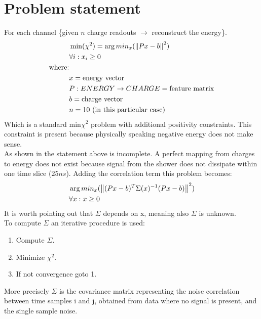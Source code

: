 \section{Problem statement}
For each channel \{given $n$ charge readouts $\rightarrow$ reconstruct the energy\}. \\
\begin{equation}\label{eq:chisq}
  \begin{split}
    & \min(\chi^2)=\arg min_x(\left\lVert Px - b\right\rVert^2) \\
    & \forall i: x_i \geq 0\\
    \text{where:}&  \\
    & x = \text{energy vector} \\
    & P:ENERGY \rightarrow CHARGE =\text{feature matrix} \\
    & b = \text{charge vector}\\
    & n = 10 \text{ (in this particular case)}
  \end{split}
\end{equation}
Which is a standard min$\chi^2$ problem with additional positivity constraints. This constraint is present because physically speaking negative energy does not make sense. \\
As shown in \cite{amplituamplitude_reconde_recon} the statement above is incomplete. A perfect mapping from charges to energy does not exist because signal from the shower does not dissipate within one time slice ($25ns$). Adding the correlation term this problem becomes:
\begin{equation}\label{eq:constrained_chi_sq}
  \begin{split}
      &\arg min_x(\left\lVert(Px - b)^T\Sigma(x)^{-1}(Px - b)\right\rVert^2) \\
      & \forall x: x \geq 0\\
  \end{split}
\end{equation}
It is worth pointing out that $\Sigma$ depends on x, meaning also $\Sigma$ is unknown. \\
To compute $\Sigma$ an iterative procedure is used:
\begin{enumerate}
  \item Compute $\Sigma$.
  \item Minimize $\chi^2$.
  \item If not convergence goto 1.
\end{enumerate}
More precisely $\Sigma$ is the covariance matrix representing the noise correlation between time samples i and j, obtained from data where no signal is present, and the single sample noise.\\
